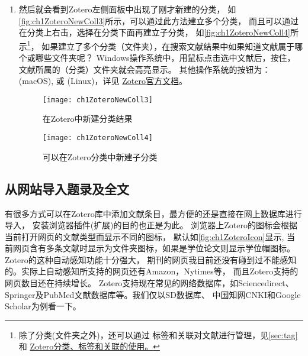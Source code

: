 \documentclass[cn,11pt,chinese]{elegantbook}
\begin{document}
\begin{enumerate}
\begin{figure}
			\end{figure}
			\item 
			然后就会看到Zotero左侧面板中出现了刚才新建的分类，
			如\autoref{fig:ch1ZoteroNewColl3}所示，可以通过此方法建立多个分类，
			而且可以通过在分类上右击，选择在分类下面再建立子分类，
			如\autoref{fig:ch1ZoteroNewColl4}所示\footnote{除了分类(文件夹之外)，还可以通过
			标签和关联对文献进行管理，见\cref{sec:tag}和
			\href{https://zhuanlan.zhihu.com/p/275707703}{Zotero分类、标签和关联的使用。}}，
			如果建立了多个分类（文件夹），在搜索文献结果中如果知道文献属于哪个或哪些文件夹呢？
			Windows操作系统中，用鼠标点击选中文献后，按住\ctrl，文献所属的（分类）文件夹就会高亮显示。
			其他操作系统的按钮为：  (macOS), 或 (Linux)，详见
			\href{https://www.zotero.org/support/collections_and_tags#identifying_collections_an_item_is_in}{Zotero官方文档}。
			
			\begin{figure}[htbp]
				\begin{minipage}[t]{0.4\linewidth}
					\centering
					\texttt{[image: ch1ZoteroNewColl3]}
					\caption{在Zotero中新建分类结果}
					\label{fig:ch1ZoteroNewColl3}
				\end{minipage}
				\begin{minipage}[t]{0.7\linewidth}
					\centering
					\texttt{[image: ch1ZoteroNewColl4]}
					\caption{可以在Zotero分类中新建子分类}
					\label{fig:ch1ZoteroNewColl4}
				\end{minipage}
			\end{figure}
		\end{enumerate}
	\subsection{从网站导入题录及全文} \label{sec:ImportFromWeb}
			有很多方式可以在Zotero库中添加文献条目，最方便的还是直接在网上数据库进行导入，
			安装浏览器插件(扩展)的目的也正是为此。
			浏览器上Zotero的图标会根据当前打开网页的文献类型而显示不同的图标，
			默认如\autoref{fig:ch1ZoteroIcon}显示,
			当前网页含有多条文献时显示为文件夹图标，如果是学位论文则显示学位帽图标。
			Zotero的这种自动感知功能十分强大，
			期刊的网页我目前还没有碰到过不能感知的。实际上自动感知所支持的网页还有Amazon，Nytimes等，
			而且Zotero支持的网页数目还在持续增长。
			Zotero支持现在常见的网络数据库，如Sciencedirect、Springer及PubMed文献数据库等。我们仅以SD数据库、
			中国知网CNKI和Google Scholar为例看一下。
\end{document}
